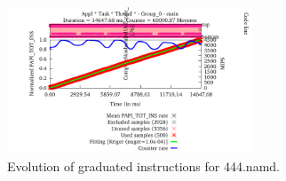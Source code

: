 \begin{figure}
  \centering
  \includegraphics[width=0.65\textwidth]{figures/user-guide/444_namd_tot_ins.pdf}
  \caption{Evolution of graduated instructions for 444.namd.}
  \label{fig:444_namd_instructions}
\end{figure}
